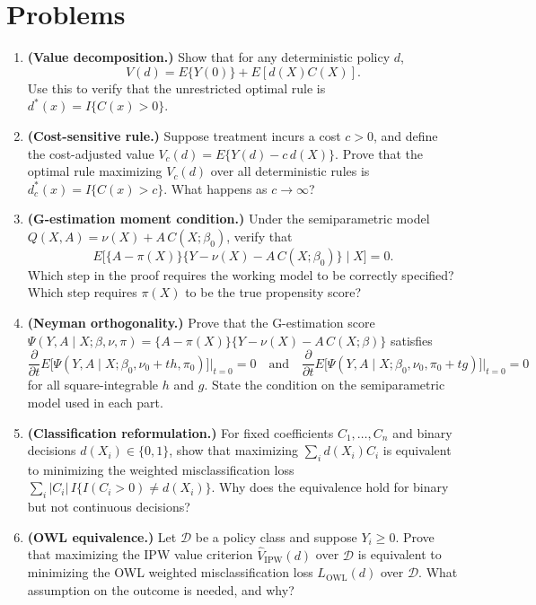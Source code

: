 \documentclass[master.tex]{subfiles}
\begin{document}
\section*{Problems}

\begin{enumerate}

    \item \textbf{(Value decomposition.)}
    Show that for any deterministic policy \(d\),
    \[
    V(d)=E\{Y(0)\}+E[d(X)C(X)].
    \]
    Use this to verify that the unrestricted optimal rule is
    \(d^\ast(x)=I\{C(x)>0\}\).

    \item \textbf{(Cost-sensitive rule.)}
    Suppose treatment incurs a cost \(c>0\), and define the cost-adjusted
    value \(V_c(d)=E\{Y(d)-c\,d(X)\}\). Prove that the optimal rule
    maximizing \(V_c(d)\) over all deterministic rules is
    \(d_c^\ast(x)=I\{C(x)>c\}\). What happens as \(c\to\infty\)?

    \item \textbf{(G-estimation moment condition.)}
    Under the semiparametric model \(Q(X,A)=\nu(X)+A\,C(X;\beta_0)\), verify
    that
    \[
    E\bigl[\{A-\pi(X)\}\{Y-\nu(X)-A\,C(X;\beta_0)\}\mid X\bigr]=0.
    \]
    Which step in the proof requires the working model to be correctly
    specified? Which step requires \(\pi(X)\) to be the true propensity score?

    \item \textbf{(Neyman orthogonality.)}
    Prove that the G-estimation score
    \(\Psi(Y,A\mid X;\beta,\nu,\pi)=\{A-\pi(X)\}\{Y-\nu(X)-A\,C(X;\beta)\}\)
    satisfies
    \[
    \frac{\partial}{\partial t}
    E\bigl[\Psi(Y,A\mid X;\beta_0,\nu_0+th,\pi_0)\bigr]\big|_{t=0}=0
    \quad\text{and}\quad
    \frac{\partial}{\partial t}
    E\bigl[\Psi(Y,A\mid X;\beta_0,\nu_0,\pi_0+tg)\bigr]\big|_{t=0}=0
    \]
    for all square-integrable \(h\) and \(g\). State the condition on the
    semiparametric model used in each part.

    \item \textbf{(Classification reformulation.)}
    For fixed coefficients \(C_1,\dots,C_n\) and binary decisions
    \(d(X_i)\in\{0,1\}\), show that maximizing \(\sum_i d(X_i)C_i\) is
    equivalent to minimizing the weighted misclassification loss
    \(\sum_i|C_i|\,I\{I(C_i>0)\neq d(X_i)\}\). Why does the equivalence
    hold for binary but not continuous decisions?

    \item \textbf{(OWL equivalence.)}
    Let \(\mathcal D\) be a policy class and suppose \(Y_i\geq 0\). Prove
    that maximizing the IPW value criterion
    \(\widehat V_{\mathrm{IPW}}(d)\) over \(\mathcal D\) is equivalent to
    minimizing the OWL weighted misclassification loss \(L_{\mathrm{OWL}}(d)\)
    over \(\mathcal D\). What assumption on the outcome is needed, and why?


\end{enumerate}
\end{document}
